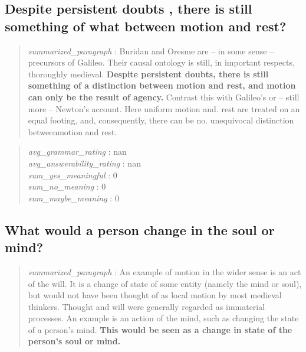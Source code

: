 \hypertarget{despite-persistent-doubts-there-is-still-something-of-what-between-motion-and-rest}{%
\subsection{Despite persistent doubts , there is still something of what
between motion and
rest?}\label{despite-persistent-doubts-there-is-still-something-of-what-between-motion-and-rest}}

\begin{quote}
\emph{summarized\_paragraph} : Buridan and Oresme are -- in some sense
-- precursors of Galileo. Their causal ontology is still, in important
respects, thoroughly medieval. \textbf{Despite persistent doubts, there
is still something of a distinction between motion and rest, and motion
can only be the result of agency.} Contrast this with Galileo's or --
still more -- Newton's account. Here uniform motion and. rest are
treated on an equal footing, and, consequently, there can be no.
unequivocal distinction betweenmotion and rest.
\end{quote}

\begin{quote}
\emph{avg\_grammar\_rating} : nan\\
\emph{avg\_answerability\_rating} : nan\\
\emph{sum\_yes\_meaningful} : 0\\
\emph{sum\_no\_meaning} : 0\\
\emph{sum\_maybe\_meaning} : 0
\end{quote}

\hypertarget{what-would-a-person-change-in-the-soul-or-mind}{%
\subsection{What would a person change in the soul or
mind?}\label{what-would-a-person-change-in-the-soul-or-mind}}

\begin{quote}
\emph{summarized\_paragraph} : An example of motion in the wider sense
is an act of the will. It is a change of state of some entity (namely
the mind or soul), but would not have been thought of as local motion by
most medieval thinkers. Thought and will were generally regarded as
immaterial processes. An example is an action of the mind, such as
changing the state of a person's mind. \textbf{This would be seen as a
change in state of the person's soul or mind.}
\end{quote}

